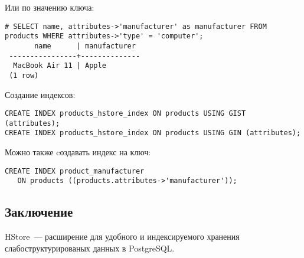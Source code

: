 Или по значению ключа:
\begin{lstlisting}[label=lst:hstore5,caption=Поиск по значению ключа]
# SELECT name, attributes->'manufacturer' as manufacturer FROM products WHERE attributes->'type' = 'computer';
       name      | manufacturer
 ----------------+--------------
  MacBook Air 11 | Apple
 (1 row)
\end{lstlisting}

Создание индексов:
\begin{lstlisting}[label=lst:hstore6,caption=Индексы]
CREATE INDEX products_hstore_index ON products USING GIST (attributes);
CREATE INDEX products_hstore_index ON products USING GIN (attributes);
\end{lstlisting}

Можно также cоздавать индекс на ключ:
\begin{lstlisting}[label=lst:hstore7,caption=Индекс на ключ]
CREATE INDEX product_manufacturer
   ON products ((products.attributes->'manufacturer'));
\end{lstlisting}

\subsection{Заключение}
HStore~--- расширение для удобного и индексируемого хранения слабоструктурированых данных в PostgreSQL.